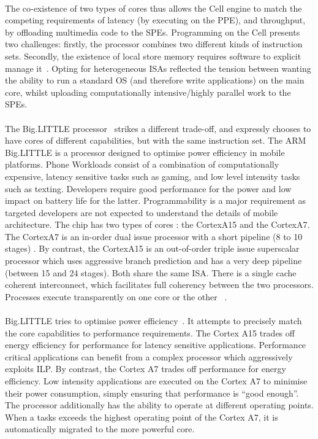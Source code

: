 \paragraph{} The co-existence of two types of cores thus allows the Cell engine to match
the competing requirements of latency (by executing on the PPE),
and throughput, by offloading multimedia code to the SPEs. 
Programming on the Cell presents two challenges: firstly, the processor
combines two different kinds of instruction sets. Secondly, the existence of 
local store memory requires software to explicit manage it~\cite{kahle2005cell}.  Opting for heterogeneous ISAs reflected the tension between wanting 
the ability to run a standard OS (and therefore write applications) on the main core, whilst uploading computationally intensive/highly parallel work to the SPEs.

\paragraph{} The Big.LITTLE processor~\cite{greenhalgh2011biglittle} strikes 
a different trade-off, and expressly chooses to have cores of different capabilities, but with the same instruction set. The ARM Big.LITTLE is a processor
designed to optimise power efficiency in mobile platforms. 
Phone Workloads consist of a combination of computationally expensive, latency sensitive tasks such as gaming, and low level intensity tasks such as texting. 
Developers require good performance for the power and low impact on battery life for the latter. Programmability is a major requirement as targeted developers
are not expected to understand the details of mobile architecture. 
 The chip has two types of cores
: the CortexA15 and the CortexA7. The CortexA7 is an in-order dual issue
processor with a short pipeline (8 to 10 stages) . By contrast,  the CortexA15
 is an out-of-order triple issue superscalar processor
which uses aggressive branch prediction and has a very deep pipeline
(between 15 and 24 stages). Both share the same ISA. There is a single cache
coherent interconnect, which facilitates full coherency between the 
two processors. Processes execute transparently on one core or the other~\cite{greenhalgh2011biglittle} .

\paragraph{} Big.LITTLE tries to optimise power efficiency~\cite{greenhalgh2011biglittle}. It attempts to 
precisely match the core capabilities to performance requirements. The Cortex A15 trades off energy efficiency for performance for latency sensitive applications. Performance critical applications
can benefit from a complex processor which aggressively exploits ILP. 
By contrast, the Cortex A7 trades off performance for energy efficiency. Low 
intensity applications are executed on the Cortex A7 to minimise their power 
consumption, simply ensuring that performance is ``good enough''.  The processor additionally has the ability to operate at different operating points. When a tasks exceeds the highest operating point of the Cortex A7, it is automatically migrated to the more powerful core. 

